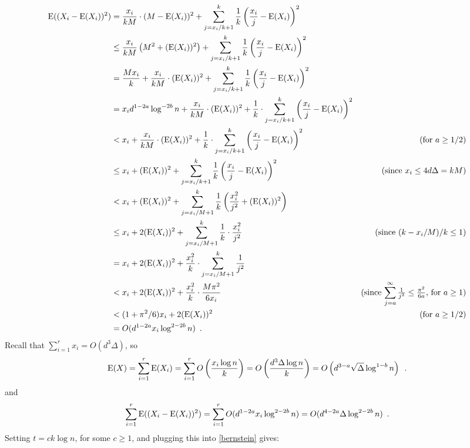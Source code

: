 \documentclass{patmorin}
\begin{document}
\begin{align*}
  \mathrm{E}((X_i-\mathrm{E}(X_i))^2)
  & = \frac{x_i}{kM}\cdot(M-\mathrm{E}(X_i))^2
    + \sum_{j=x_i/k+1}^k \frac{1}{k}\left(\frac{x_i}{j}-\mathrm{E}(X_i)\right)^2 \\
  & \le \frac{x_i}{kM}\left(M^2 + (\mathrm{E}(X_i))^2\right)
    + \sum_{j=x_i/k+1}^k \frac{1}{k}\left(\frac{x_i}{j}-\mathrm{E}(X_i)\right)^2 \\
  & = \frac{M x_i}{k} + \frac{x_i}{kM}\cdot (\mathrm{E}(X_i))^2
      + \sum_{j=x_i/k+1}^k \frac{1}{k}\left(\frac{x_i}{j}-\mathrm{E}(X_i)\right)^2 \\
  & = x_id^{1-2a}\log^{-2b}n + \frac{x_i}{kM}\cdot (\mathrm{E}(X_i))^2
      + \frac{1}{k}\cdot\sum_{j=x_i/k+1}^k \left(\frac{x_i}{j}-\mathrm{E}(X_i)\right)^2 \\
  & < x_i + \frac{x_i}{kM}\cdot (\mathrm{E}(X_i))^2
      + \frac{1}{k}\cdot\sum_{j=x_i/k+1}^k \left(\frac{x_i}{j}-\mathrm{E}(X_i)\right)^2
      & \text{(for $a\ge 1/2$)} \\
  & \le x_i + (\mathrm{E}(X_i))^2
      + \sum_{j=x_i/k+1}^k \frac{1}{k}\left(\frac{x_i}{j}-\mathrm{E}(X_i)\right)^2
      & \text{\quad(since $x_i\le 4d\Delta= kM$)} \\
 & < x_i + (\mathrm{E}(X_i))^2 + \sum_{j=x_i/M+1}^k \frac{1}{k}\left(\frac{x_i^2}{j^2} + (\mathrm{E}(X_i))^2\right) \\
 & \le x_i + 2(\mathrm{E}(X_i))^2  +  \sum_{j=x_i/M+1}^k\frac{1}{k}\cdot\frac{x_i^2}{j^2}
 & \text{(since $(k-x_i/M)/k \le 1$)} \\
 & = x_i + 2(\mathrm{E}(X_i))^2  +  \frac{x_i^2}{k}\cdot \sum_{j=x_i/M+1}^k\frac{1}{j^2} \\
 & < x_i + 2(\mathrm{E}(X_i))^2 + \frac{x_i^2}{k}\cdot\frac{M\pi^2}{6 x_i}
    & \text{(since $\sum_{j=a}^{\infty} \tfrac{1}{j^2} \le \tfrac{\pi^2}{6a}$, for $a\ge 1$)} \\
 & < (1+\pi^2/6)x_i + 2(\mathrm{E}(X_i))^2
    & \text{(for $a\ge 1/2$)} \\
  & = O(d^{1-2a}x_i\log^{2-2b}n) \enspace .
\end{align*}
Recall that $\sum_{i=1}^r x_i = O(d^3\Delta)$, so
\[
  \mathrm{E}(X)
  = \sum_{i=1}^r \mathrm{E}(X_i)
  = \sum_{i=1}^r O\left(\frac{x_i\log n}{k}\right)
  = O\left(\frac{d^3\Delta\log n}{k}\right)
  = O\left(d^{3-a}\sqrt{\Delta}\log^{1-b} n\right) \enspace .
\]
and
\[
  \sum_{i=1}^r\mathrm{E}((X_i-\mathrm{E}(X_i))^2)
  = \sum_{i=1}^r O(d^{1-2a}x_i\log^{2-2b} n)
  = O(d^{4-2a}\Delta\log^{2-2b} n)  \enspace .
\]
Setting $t=ck\log n$, for some $c\ge 1$, and plugging this into \cref{bernstein} gives:
\end{document}
